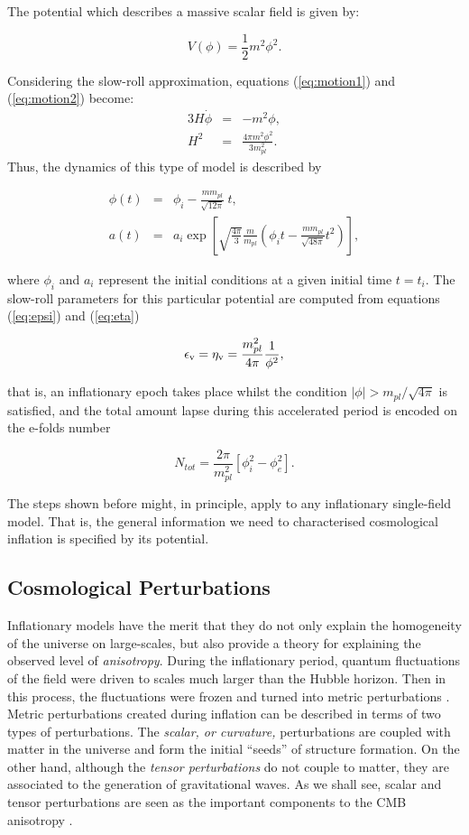 \documentclass{rmaa}
\def\beq{\begin{equation}}
\def\eeq{\end{equation}}
\def\bea{\begin{eqnarray}}
\def\eea{\end{eqnarray}}
\begin{document}
The potential which describes a massive scalar field is given by:

\beq \label{eq:mass}
V(\phi)= \frac{1}{2}m^2 \phi^2.
\eeq

\noindent
Considering the slow-roll approximation, equations (\ref{eq:motion1}) and (\ref{eq:motion2}) become:
%
\bea
3H\dot \phi &=& -m^2 \phi, \\
H^2 &=& \frac{4\pi m^2 \phi^2}{3 m_{pl}^2}.\nonumber
\eea
\noindent
Thus, the dynamics of this type of model is described by

\bea
\phi(t)&=&\phi_i - \frac{m m_{pl}}{\sqrt{12 \pi}}~t,\\
a(t)&=& a_i \exp\left[\sqrt{\frac{4\pi}{3}}\frac{m}{m_{pl}}\left( \phi_i t - \frac{m m_{pl}}{\sqrt{48 \pi}}t^2 \right) \right], \nonumber
\eea

\noindent
where $\phi_i$ and $a_i$ represent the initial conditions at a given initial time $t=t_i$.
The slow-roll parameters for this particular potential are computed from 
equations (\ref{eq:epsi}) and (\ref{eq:eta})

\beq
\epsilon_{\rm v}=\eta_{\rm v}= \frac{m_{pl}^2}{4\pi} \frac{1}{\phi^2}, 
\eeq

\noindent
that is, an inflationary epoch takes place whilst the condition $|\phi|> {m_{pl}}/\sqrt{4\pi}$ 
is satisfied, and the total amount lapse during this accelerated period is encoded on the e-folds number

\beq
N_{tot}= \frac{2\pi}{m_{pl}^2}\left[\phi^2_i - \phi^2_e \right].
\eeq 

The steps shown before might, in principle, apply to any inflationary single-field model. 
That is, the general information we need to characterised 
cosmological inflation is specified by its potential. 

 
\subsection{Cosmological Perturbations}

Inflationary models have the merit that they do not only explain the 
 homogeneity of the universe on large-scales,
but also provide a theory  for explaining the observed level of {\em
anisotropy}. During the inflationary period, quantum fluctuations of the field 
were driven to scales much larger than the Hubble horizon. Then in this process, the fluctuations
were frozen and turned into metric perturbations \citep{Mukhanov}. 
%
Metric perturbations created during inflation can be described in terms of two types of perturbations.
The {\it scalar, or curvature,} perturbations are coupled with matter in the
universe and form the initial ``seeds'' of structure formation. On the other hand, although the 
{\it tensor perturbations} do not couple to matter, they are associated
to the generation of gravitational waves.
As we shall see, scalar and tensor perturbations are seen as the important components to 
 the CMB anisotropy \citep{Hu}. 
\\
\end{document}
